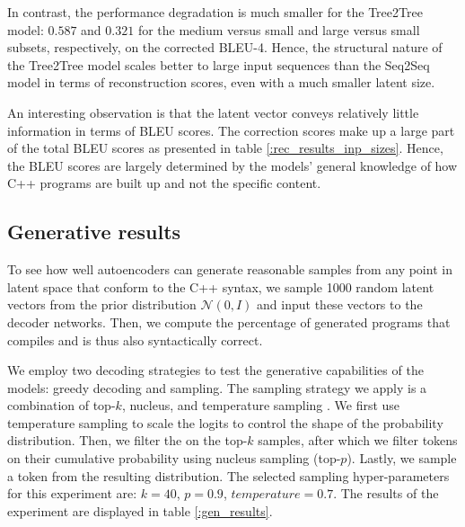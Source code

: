 In contrast, the performance degradation is much smaller for the Tree2Tree model:  $0.587$ and $0.321$ for the medium versus small and large versus small subsets, respectively, on the corrected BLEU-4. Hence, the structural nature of the Tree2Tree model scales better to large input sequences than the Seq2Seq model in terms of reconstruction scores, even with a much smaller latent size. 



An interesting observation is that the latent vector conveys relatively little information in terms of BLEU scores. The correction scores make up a large part of the total BLEU scores as presented in table \ref{:rec_results_inp_sizes}. Hence, the BLEU scores are largely determined by the models' general knowledge of how C++ programs are built up and not the specific content.

\subsection{Generative results}
\label{results:gen}
To see how well autoencoders can generate reasonable samples from any point in latent space that conform to the C++ syntax, we sample 1000 random latent vectors from the prior distribution $\mathcal{N}(0, I)$ and input these vectors to the decoder networks. Then, we compute the percentage of generated programs that compiles and is thus also syntactically correct.



We employ two decoding strategies to test the generative capabilities of the models: greedy decoding and sampling. The sampling strategy we apply is a combination of top-$k$, nucleus, and temperature sampling \cite{holtzman2019curious}. We first use temperature sampling to scale the logits to control the shape of the probability distribution. Then, we filter the on the top-$k$ samples, after which we filter tokens on their cumulative probability using nucleus sampling (top-$p$). Lastly, we sample a token from the resulting distribution. The selected sampling hyper-parameters for this experiment are: $k=40$, $p=0.9$, $temperature=0.7$. The results of the experiment are displayed in table \ref{:gen_results}.

